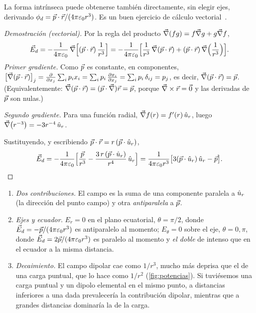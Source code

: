 La forma intrínseca puede obtenerse también directamente, sin elegir ejes, derivando $\phi_{d}=\vec{p}\cdot\vec{r}/(4\pi\varepsilon_{0} r^{3})$. Es un buen
ejercicio de cálculo vectorial~\cite{TEMA0}.

\begin{proof}[Demostración (vectorial)]
Por la regla del producto $\vec{\nabla}(fg)=f\vec{\nabla} g+g\vec{\nabla} f$,
\[
  \vec{E}_{d}=-\frac{1}{4\pi\varepsilon_{0}}\,\vec{\nabla}\Bigl[(\vec{p}\cdot\vec{r})\,\frac{1}{r^{3}}\Bigr]
  =-\frac{1}{4\pi\varepsilon_{0}}\Bigl[\frac{1}{r^{3}}\,\vec{\nabla}(\vec{p}\cdot\vec{r})+(\vec{p}\cdot\vec{r})\,\vec{\nabla}\Bigl(\frac{1}{r^{3}}\Bigr)\Bigr].
\]
\emph{Primer gradiente.} Como $\vec{p}$ es constante, en componentes, $\bigl[\vec{\nabla}(\vec{p}\cdot\vec{r})\bigr]_{j}=\frac{\partial }{\partial x_j}\sum_{i}p_i x_i=\sum_i p_i\,\frac{\partial x_i}{\partial x_j}
=\sum_i p_i\,\delta_{ij}=p_j$, es decir, $\vec{\nabla}(\vec{p}\cdot\vec{r})=\vec{p}$. (Equivalentemente: $\vec{\nabla}(\vec{p}\cdot\vec{r})=(\vec{p}\cdot\vec{\nabla})\vec{r}=\vec{p}$, porque
$\vec{\nabla}\times\vec{r}=\vec{0}$ y las derivadas de $\vec{p}$ son nulas.)

\emph{Segundo gradiente.} Para una función radial, $\vec{\nabla} f(r)=f'(r)\,\hat{u}_{r}$, luego $\vec{\nabla}\bigl(r^{-3}\bigr)=-3r^{-4}\,\hat{u}_{r}$.

Sustituyendo, y escribiendo $\vec{p}\cdot\vec{r}=r\,(\vec{p}\cdot\hat{u}_{r})$,
\[
  \vec{E}_{d}=-\frac{1}{4\pi\varepsilon_{0}}\Bigl[\frac{\vec{p}}{r^{3}}-\frac{3\,r\,(\vec{p}\cdot\hat{u}_{r})}{r^{4}}\,\hat{u}_{r}\Bigr]=\frac{1}{4\pi\varepsilon_{0} r^{3}}\bigl[3(\vec{p}\cdot\hat{u}_{r})\,\hat{u}_{r}-\vec{p}\bigr].\qedhere
\]
\end{proof}

\begin{observacion}\label{obs:estructura}
\begin{enumerate}[label=(\alph*)]
  \item \emph{Dos contribuciones.} El campo es la suma de una componente paralela a $\hat{u}_{r}$ (la dirección del punto campo) y otra
        \emph{antiparalela} a $\vec{p}$.
  \item \emph{Ejes y ecuador.} $E_{r}=0$ en el plano ecuatorial, $\theta=\pi/2$, donde $\vec{E}_{d}=-\vec{p}/(4\pi\varepsilon_{0} r^{3})$ es antiparalelo al momento;
        $E_{\theta}=0$ sobre el eje, $\theta=0,\pi$, donde $\vec{E}_{d}=2\vec{p}/(4\pi\varepsilon_{0} r^{3})$ es paralelo al momento y \emph{el doble} de intenso que en el
        ecuador a la misma distancia.
  \item \emph{Decaimiento.} El campo dipolar cae como $1/r^{3}$, mucho más deprisa que el de una carga puntual, que lo hace como $1/r^{2}$
        (\cref{fig:potencias}). Si tuviésemos una carga puntual y un dipolo elemental en el mismo punto, a distancias inferiores a una dada
        prevalecería la contribución dipolar, mientras que a grandes distancias dominaría la de la carga.
\end{enumerate}
\end{observacion}

